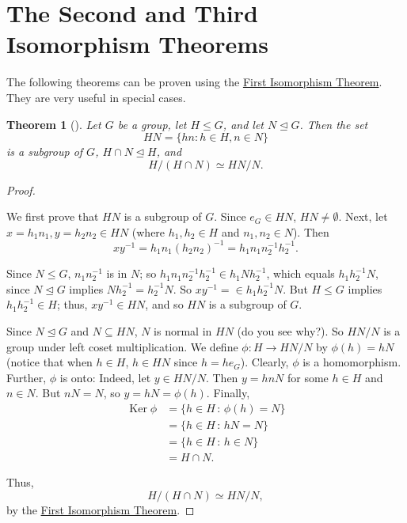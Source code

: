 \documentclass[10pt,]{book}
\theoremstyle{plain}
\newtheorem{theorem}{Theorem}[section]
\theoremstyle{definition}
\theoremstyle{definition}
\theoremstyle{definition}
\theoremstyle{definition}
\numberwithin{equation}{section}
\DeclareMathOperator{\Ker}{Ker}
\newcommand{\amp}{&}
\begin{document}
\section[{The Second and Third Isomorphism Theorems}]{The Second and Third Isomorphism Theorems}\label{section-29}
The following theorems can be proven using the \hyperref[fit]{First Isomorphism Theorem}. They are very useful in special cases.%
\begin{theorem}[{}]\label{sit}
Let \(G\) be a group, let \(H\leq G\), and let \(N\unlhd G\). Then the set%
\begin{equation*}
HN=\{hn:h\in H, n\in N\}
\end{equation*}
is a subgroup of \(G\), \(H\cap N\unlhd H\), and%
\begin{equation*}
H/(H\cap N) \simeq
HN/N.
\end{equation*}
%
\end{theorem}
\begin{proof}\hypertarget{proof-55}{}
We first prove that \(HN\) is a subgroup of \(G\). Since \(e_G\in
HN\), \(HN\neq \emptyset\). Next, let \(x=h_1n_1, y=h_2n_2\in HN\) (where \(h_1,h_2\in H\) and \(n_1,n_2\in N\)). Then%
\begin{equation*}
xy^{-1}=h_1n_1(h_2n_2)^{-1}=h_1n_1n_2^{-1}h_2^{-1}.
\end{equation*}
%
\par
Since \(N\leq G\), \(n_1n_2^{-1}\) is in \(N\); so \(h_1n_1n_2^{-1}h_2^{-1}\in
h_1Nh_2^{-1}\), which equals \(h_1h_2^{-1}N\), since \(N\unlhd G\) implies \(Nh_2^{-1}=h_2^{-1}N\). So \(xy^{-1}=\in h_1h_2^{-1}N.\) But \(H\leq G\) implies \(h_1h_2^{-1}\in H\); thus, \(xy^{-1}\in HN\), and so \(HN\) is a subgroup of \(G\).%
\par
Since \(N\unlhd G\) and \(N\subseteq HN\), \(N\) is normal in \(HN\) (do you see why?). So \(HN/N\) is a group under left coset multiplication. We define \(\phi: H\to HN/N\) by \(\phi(h)=hN\) (notice that when \(h\in H\), \(h\in HN\) since \(h=he_G\)). Clearly, \(\phi\) is a homomorphism. Further, \(\phi\) is onto: Indeed, let \(y\in HN/N\). Then \(y=hnN\) for some \(h\in H\) and \(n\in N\). But \(nN=N\), so \(y=hN=\phi(h)\). Finally,%
\begin{align*}
\Ker \phi\amp =\{h\in H\,:\, \phi(h)=N\}\\
\amp =\{h\in H\,:\, hN=N\}\\
\amp =\{h\in
H\,:\, h\in N\}\\
\amp =H\cap N.
\end{align*}
%
\par
Thus,%
\begin{equation*}
H/(H\cap N)
\simeq HN/N,
\end{equation*}
by the \hyperref[fit]{First Isomorphism Theorem}.%
\end{proof}
\end{document}
